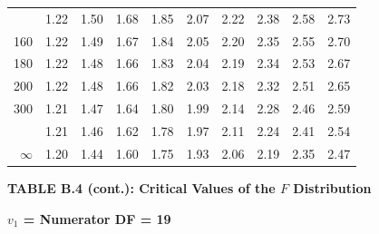 \documentclass[10pt]{article}
\begin{document}
\begin{longtable}{@{}r!{\vrule width 0.8pt\hspace{0.55em}}rrrrrrrrr@{}}
 & 1.22 & 1.50 & 1.68 & 1.85 & 2.07 & 2.22 & 2.38 & 2.58 & 2.73 \\
160 & 1.22 & 1.49 & 1.67 & 1.84 & 2.05 & 2.20 & 2.35 & 2.55 & 2.70 \\
180 & 1.22 & 1.48 & 1.66 & 1.83 & 2.04 & 2.19 & 2.34 & 2.53 & 2.67 \\
200 & 1.22 & 1.48 & 1.66 & 1.82 & 2.03 & 2.18 & 2.32 & 2.51 & 2.65 \\
300 & 1.21 & 1.47 & 1.64 & 1.80 & 1.99 & 2.14 & 2.28 & 2.46 & 2.59 \\
 & 1.21 & 1.46 & 1.62 & 1.78 & 1.97 & 2.11 & 2.24 & 2.41 & 2.54 \\
$\infty$ & 1.20 & 1.44 & 1.60 & 1.75 & 1.93 & 2.06 & 2.19 & 2.35 & 2.47 \\
\end{longtable}
\newpage
\thispagestyle{empty}
\begin{center}
{\large\bfseries TABLE B.4 (cont.): Critical Values of the $F$ Distribution\par}
\end{center}
{\large\bfseries $v_1$ = Numerator DF = 19\par}
\vspace{0.5em}
\small
\end{document}

